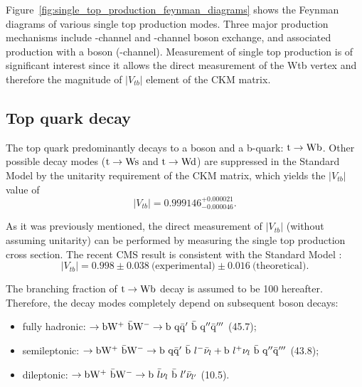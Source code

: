 

Figure~\ref{fig:single_top_production_feynman_diagrams} shows the Feynman diagrams of various single top production
modes. Three major production mechanisms include \cPqs-channel and \cPqt-channel \W boson exchange, and associated
production with a \W boson (\tW-channel). Measurement of single top production is of significant interest since it
allows the direct measurement of the Wtb vertex and therefore the magnitude of $|V_{tb}|$ element of the CKM matrix.



\subsection{Top quark decay}
\label{ss:top_decay}
The top quark predominantly decays to a \W boson and a b-quark: $\mathrm{t} \rightarrow \mathrm{W} \mathrm{b}$. Other possible decay modes
($\mathrm{t} \rightarrow \mathrm{W} \mathrm{s}$ and $\mathrm{t} \rightarrow \mathrm{W} \mathrm{d}$) are suppressed in the Standard Model by the unitarity
requirement of the CKM matrix, which yields \autocite{PDG} the $|V_{tb}|$ value of
\begin{equation}
|V_{tb}| = 0.999146^{+0.000021}_{-0.000046}.
\end{equation}

As it was previously mentioned, the direct measurement of $|V_{tb}|$ (without assuming unitarity) can be performed by
measuring the single top production cross section. The recent CMS result is consistent with the Standard
Model \autocite{single_top_Vtb_CMS}:
\begin{equation}
|V_{tb}| = 0.998 \pm 0.038~\textrm{(experimental)} \pm 0.016~\textrm{(theoretical)}.
\end{equation}

The branching fraction of $\mathrm{t} \rightarrow \mathrm{W} \mathrm{b}$ decay is assumed to be \SI{100}{\pc} hereafter. Therefore, the
\ttbar decay modes completely depend on subsequent \W boson decays:
\begin{itemize}
  \item fully hadronic: \ttbar $\rightarrow \mathrm{b} \mathrm{W}^+ ~ \bar{\mathrm{b}} \mathrm{W}^- \rightarrow  \mathrm{b}~\mathrm{q}\bar{\mathrm{q}}' ~
  \bar{\mathrm{b}}~\mathrm{q}'' \bar{\mathrm{q}}'''$ (\SI{45.7}{\pc});
  \item semileptonic: \ttbar $\rightarrow \mathrm{b} \mathrm{W}^+ ~ \bar{\mathrm{b}} \mathrm{W}^- \rightarrow \mathrm{b}~\mathrm{q}\bar{\mathrm{q}}' ~ \bar{\mathrm{b}}
  ~ l^- \bar{\nu}_l + \mathrm{b}~l^+ \nu_l ~ \bar{\mathrm{b}}~\mathrm{q}'' \bar{\mathrm{q}}'''$ (\SI{43.8}{\pc});
  \item dileptonic: \ttbar $\rightarrow \mathrm{b} \mathrm{W}^+ ~ \bar{\mathrm{b}} \mathrm{W}^- \rightarrow  \mathrm{b}~\bar{l} \nu_l ~ \bar{\mathrm{b}} ~
  l'\bar{\nu}_{l'}$ (\SI{10.5}{\pc}).
\end{itemize}

